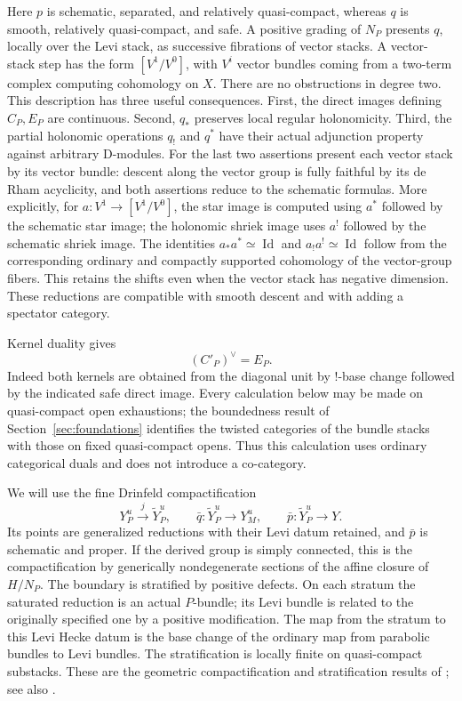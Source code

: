 \documentclass[11pt]{article}
\numberwithin{equation}{section}
\theoremstyle{definition}
\theoremstyle{remark}
\begin{document}
Here $p$ is schematic, separated, and relatively quasi-compact, whereas $q$
is smooth, relatively quasi-compact, and safe.  A positive grading of $N_P$
presents $q$, locally over the Levi stack, as successive fibrations of vector
stacks.  A vector-stack step has the form $[V^1/V^0]$, with $V^i$ vector bundles
coming from a two-term complex computing cohomology on $X$.  There are no
obstructions in degree two.  This description has three useful consequences.
First, the direct images defining $C_P,E_P$ are continuous.  Second, $q_*$
preserves local regular holonomicity.  Third, the partial holonomic operations
$q_!$ and $q^*$ have their actual adjunction property against arbitrary
D-modules.  For the last two assertions present each vector stack by its
vector bundle: descent along the vector group is fully faithful by its de
Rham acyclicity, and both assertions reduce to the schematic formulas.
More explicitly, for $a:V^1\to[V^1/V^0]$, the star image is
computed using $a^*$ followed by the schematic star image; the holonomic
shriek image uses $a^!$ followed by the schematic shriek image.  The
identities $a_*a^*\simeq\operatorname{Id}$ and
$a_!a^!\simeq\operatorname{Id}$ follow from the corresponding ordinary
and compactly supported cohomology of the vector-group fibers.  This
retains the shifts even when the vector stack has negative dimension.
These reductions are compatible with smooth descent and with adding a
spectator category.

Kernel duality gives
\[
 (C'_P)^\vee=E_P.
\]
Indeed both kernels are obtained from the diagonal unit by !-base change
followed by the indicated safe direct image.  Every calculation below may
be made on quasi-compact open exhaustions; the boundedness result of
Section~\ref{sec:foundations} identifies the twisted categories of the bundle
stacks with those on fixed quasi-compact opens.  Thus this calculation uses
ordinary categorical duals and does not introduce a co-category.

We will use the fine Drinfeld compactification
\[
 Y_P^u\xrightarrow{\ j\ }\widetilde Y_P^u,
 \qquad \bar q:\widetilde Y_P^u\longrightarrow Y_M^u,
 \qquad \bar p:\widetilde Y_P^u\longrightarrow Y.
\]
Its points are generalized reductions with their Levi datum retained, and
$\bar p$ is schematic and proper.  If the derived group is simply connected,
this is the compactification by generically nondegenerate sections of the
affine closure of $H/N_P$.  The boundary is stratified by positive defects.
On each stratum the saturated reduction is an actual $P$-bundle; its Levi
bundle is related to the originally specified one by a positive
modification.  The map from the stratum to this Levi Hecke datum is the
base change of the ordinary map from parabolic bundles to Levi bundles.
The stratification is locally finite on quasi-compact substacks.  These are
the geometric compactification and stratification results of
\cite{BravermanGaitsgory}; see also
\cite[Sections~3.2--3.3]{SchiederVinberg}.
\end{document}
